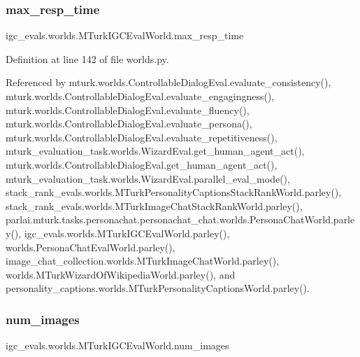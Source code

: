\subsubsection{\texorpdfstring{max\+\_\+resp\+\_\+time}{max\_resp\_time}}
{\footnotesize\ttfamily igc\+\_\+evals.\+worlds.\+M\+Turk\+I\+G\+C\+Eval\+World.\+max\+\_\+resp\+\_\+time}



Definition at line 142 of file worlds.\+py.



Referenced by mturk.\+worlds.\+Controllable\+Dialog\+Eval.\+evaluate\+\_\+consistency(), mturk.\+worlds.\+Controllable\+Dialog\+Eval.\+evaluate\+\_\+engagingness(), mturk.\+worlds.\+Controllable\+Dialog\+Eval.\+evaluate\+\_\+fluency(), mturk.\+worlds.\+Controllable\+Dialog\+Eval.\+evaluate\+\_\+persona(), mturk.\+worlds.\+Controllable\+Dialog\+Eval.\+evaluate\+\_\+repetitiveness(), mturk\+\_\+evaluation\+\_\+task.\+worlds.\+Wizard\+Eval.\+get\+\_\+human\+\_\+agent\+\_\+act(), mturk.\+worlds.\+Controllable\+Dialog\+Eval.\+get\+\_\+human\+\_\+agent\+\_\+act(), mturk\+\_\+evaluation\+\_\+task.\+worlds.\+Wizard\+Eval.\+parallel\+\_\+eval\+\_\+mode(), stack\+\_\+rank\+\_\+evals.\+worlds.\+M\+Turk\+Personality\+Captions\+Stack\+Rank\+World.\+parley(), stack\+\_\+rank\+\_\+evals.\+worlds.\+M\+Turk\+Image\+Chat\+Stack\+Rank\+World.\+parley(), parlai.\+mturk.\+tasks.\+personachat.\+personachat\+\_\+chat.\+worlds.\+Persona\+Chat\+World.\+parley(), igc\+\_\+evals.\+worlds.\+M\+Turk\+I\+G\+C\+Eval\+World.\+parley(), worlds.\+Persona\+Chat\+Eval\+World.\+parley(), image\+\_\+chat\+\_\+collection.\+worlds.\+M\+Turk\+Image\+Chat\+World.\+parley(), worlds.\+M\+Turk\+Wizard\+Of\+Wikipedia\+World.\+parley(), and personality\+\_\+captions.\+worlds.\+M\+Turk\+Personality\+Captions\+World.\+parley().

\mbox{\label{classigc__evals_1_1worlds_1_1MTurkIGCEvalWorld_a74353f0142ea14589f660799b33aec27}} 
\subsubsection{\texorpdfstring{num\+\_\+images}{num\_images}}
{\footnotesize\ttfamily igc\+\_\+evals.\+worlds.\+M\+Turk\+I\+G\+C\+Eval\+World.\+num\+\_\+images}




